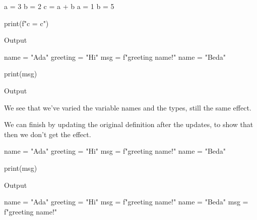 \begin{description}
      \begin{frame}[fragile]
      \begin{minipage}[t]{0.45\columnwidth}
        \begin{pyblock}[varstateG1]
a = 3
b = 2
c = a + b
a = 1
b = 5

print(f"c = {c}")
        \end{pyblock}
        \begin{block}{Output}\printpythontex[verbatim]\end{block}
      \end{minipage}
      \hfill
      \begin{minipage}[t]{0.45\columnwidth}
        \begin{pyblock}[varstateG2]
name = "Ada"
greeting = "Hi"
msg = f"{greeting} {name}!"
name = "Beda"


print(msg)
        \end{pyblock}
        \begin{block}{Output}\printpythontex[verbatim]\end{block}
      \end{minipage}
      \end{frame}

      We see that we've varied the variable names and the types, still the same 
      effect.

      We can finish by updating the original definition after the updates, to 
      show that then we don't get the effect.

      \begin{frame}[fragile]
      \begin{minipage}[t]{0.45\columnwidth}
        \begin{pyblock}[varstateG2]
name = "Ada"
greeting = "Hi"
msg = f"{greeting} {name}!"
name = "Beda"


print(msg)
        \end{pyblock}
        \begin{block}{Output}\printpythontex[verbatim]\end{block}
      \end{minipage}
      \hfill
      \begin{minipage}[t]{0.45\columnwidth}
        \begin{pyblock}[varstateG2][highlightlines=5]
name = "Ada"
greeting = "Hi"
msg = f"{greeting} {name}!"
name = "Beda"
msg = f"{greeting} {name}!"


\end{pyblock}
\end{minipage}
\end{frame}
\end{description}

